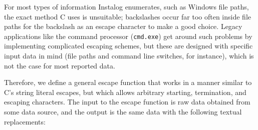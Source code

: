 For most types of information Instalog enumerates, such as Windows file paths,
the exact method C uses is unsuitable; backslashes occur far too often inside
file paths for the backslash as an escape character to make a good choice.
Legacy applications like the command processor (\texttt{cmd.exe}) get around
such problems by implementing complicated escaping schemes, but these are
designed with specific input data in mind (file paths and command line
switches, for instance), which is not the case for most reported data.

\label{generalescape}
Therefore, we define a general escape function that works in a manner similar to
C's string literal escapes, but which allows arbitrary starting, termination,
and escaping characters. The input to the escape function is raw data obtained
from some data source, and the output is the same data with the following
textual replacements:

